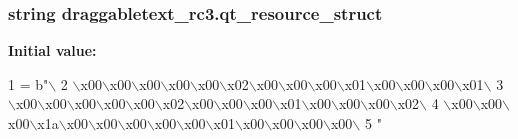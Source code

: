 \subsubsection[{qt\+\_\+resource\+\_\+struct}]{\setlength{\rightskip}{0pt plus 5cm}string draggabletext\+\_\+rc3.\+qt\+\_\+resource\+\_\+struct}\label{namespacedraggabletext__rc3_a3332625f1b76a34da7b5055386e0ac03}
{\bfseries Initial value\+:}
\begin{DoxyCode}
1 = b\textcolor{stringliteral}{"\(\backslash\)}
2 \textcolor{stringliteral}{\(\backslash\)x00\(\backslash\)x00\(\backslash\)x00\(\backslash\)x00\(\backslash\)x00\(\backslash\)x02\(\backslash\)x00\(\backslash\)x00\(\backslash\)x00\(\backslash\)x01\(\backslash\)x00\(\backslash\)x00\(\backslash\)x00\(\backslash\)x01\(\backslash\)}
3 \textcolor{stringliteral}{\(\backslash\)x00\(\backslash\)x00\(\backslash\)x00\(\backslash\)x00\(\backslash\)x00\(\backslash\)x02\(\backslash\)x00\(\backslash\)x00\(\backslash\)x00\(\backslash\)x01\(\backslash\)x00\(\backslash\)x00\(\backslash\)x00\(\backslash\)x02\(\backslash\)}
4 \textcolor{stringliteral}{\(\backslash\)x00\(\backslash\)x00\(\backslash\)x00\(\backslash\)x1a\(\backslash\)x00\(\backslash\)x00\(\backslash\)x00\(\backslash\)x00\(\backslash\)x00\(\backslash\)x01\(\backslash\)x00\(\backslash\)x00\(\backslash\)x00\(\backslash\)x00\(\backslash\)}
5 \textcolor{stringliteral}{"}
\end{DoxyCode}
